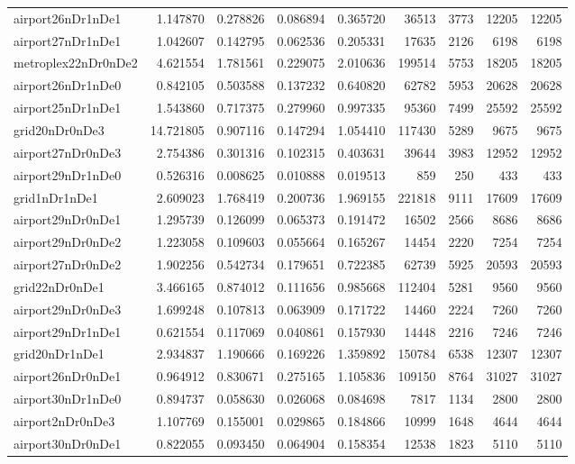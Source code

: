 \begin{longtable}{|l|r|r|r|r|r|r|r|r|}
airport26nDr1nDe1 & 1.147870 & 0.278826 & 0.086894 & 0.365720 & 36513 & 3773 & 12205 & 12205 \\
airport27nDr1nDe1 & 1.042607 & 0.142795 & 0.062536 & 0.205331 & 17635 & 2126 & 6198 & 6198 \\
metroplex22nDr0nDe2 & 4.621554 & 1.781561 & 0.229075 & 2.010636 & 199514 & 5753 & 18205 & 18205 \\
airport26nDr1nDe0 & 0.842105 & 0.503588 & 0.137232 & 0.640820 & 62782 & 5953 & 20628 & 20628 \\
airport25nDr1nDe1 & 1.543860 & 0.717375 & 0.279960 & 0.997335 & 95360 & 7499 & 25592 & 25592 \\
grid20nDr0nDe3 & 14.721805 & 0.907116 & 0.147294 & 1.054410 & 117430 & 5289 & 9675 & 9675 \\
airport27nDr0nDe3 & 2.754386 & 0.301316 & 0.102315 & 0.403631 & 39644 & 3983 & 12952 & 12952 \\
airport29nDr1nDe0 & 0.526316 & 0.008625 & 0.010888 & 0.019513 & 859 & 250 & 433 & 433 \\
grid1nDr1nDe1 & 2.609023 & 1.768419 & 0.200736 & 1.969155 & 221818 & 9111 & 17609 & 17609 \\
airport29nDr0nDe1 & 1.295739 & 0.126099 & 0.065373 & 0.191472 & 16502 & 2566 & 8686 & 8686 \\
airport29nDr0nDe2 & 1.223058 & 0.109603 & 0.055664 & 0.165267 & 14454 & 2220 & 7254 & 7254 \\
airport27nDr0nDe2 & 1.902256 & 0.542734 & 0.179651 & 0.722385 & 62739 & 5925 & 20593 & 20593 \\
grid22nDr0nDe1 & 3.466165 & 0.874012 & 0.111656 & 0.985668 & 112404 & 5281 & 9560 & 9560 \\
airport29nDr0nDe3 & 1.699248 & 0.107813 & 0.063909 & 0.171722 & 14460 & 2224 & 7260 & 7260 \\
airport29nDr1nDe1 & 0.621554 & 0.117069 & 0.040861 & 0.157930 & 14448 & 2216 & 7246 & 7246 \\
grid20nDr1nDe1 & 2.934837 & 1.190666 & 0.169226 & 1.359892 & 150784 & 6538 & 12307 & 12307 \\
airport26nDr0nDe1 & 0.964912 & 0.830671 & 0.275165 & 1.105836 & 109150 & 8764 & 31027 & 31027 \\
airport30nDr1nDe0 & 0.894737 & 0.058630 & 0.026068 & 0.084698 & 7817 & 1134 & 2800 & 2800 \\
airport2nDr0nDe3 & 1.107769 & 0.155001 & 0.029865 & 0.184866 & 10999 & 1648 & 4644 & 4644 \\
airport30nDr0nDe1 & 0.822055 & 0.093450 & 0.064904 & 0.158354 & 12538 & 1823 & 5110 & 5110 \\

\end{longtable}
